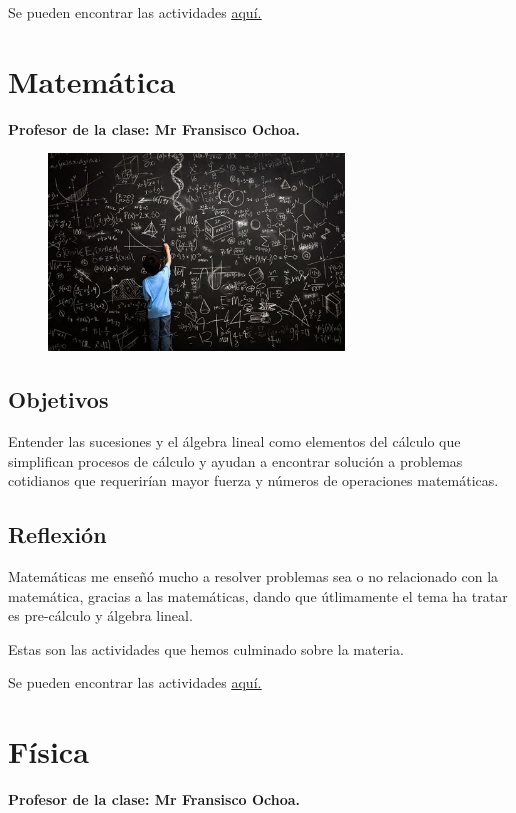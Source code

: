 \documentclass[a4paper, 12pt]{article}
\begin{document}
Se pueden encontrar las actividades \href{https://drive.google.com/drive/folders/1sVpbMzXSFN_uNBDNxBb1wdva3F2rRT37?usp=sharing}{\underline{aquí.}}

\section{Matemática}
\textbf{Profesor de la clase: Mr Fransisco Ochoa.}
\begin{figure}[h!]
  \includegraphics[width=0.7\textwidth, center]{math.jpeg}
\end{figure}

\subsection{Objetivos}
Entender las sucesiones y el álgebra lineal como elementos del cálculo que simplifican procesos de cálculo y ayudan a encontrar solución a problemas cotidianos que requerirían mayor fuerza y números de operaciones matemáticas.

\subsection{Reflexión}

Matemáticas me enseñó mucho a resolver problemas sea o no relacionado con la matemática, gracias a las matemáticas, dando que útlimamente el tema ha tratar es pre-cálculo y álgebra lineal.

Estas son las actividades que hemos culminado sobre la materia.

Se pueden encontrar las actividades \href{https://drive.google.com/drive/folders/1PRIU_AXDg9u1KO9Lou-fAq308nmebbqo?usp=sharing}{\underline{aquí.}}

\section{Física}
\textbf{Profesor de la clase: Mr Fransisco Ochoa.}
\end{document}
